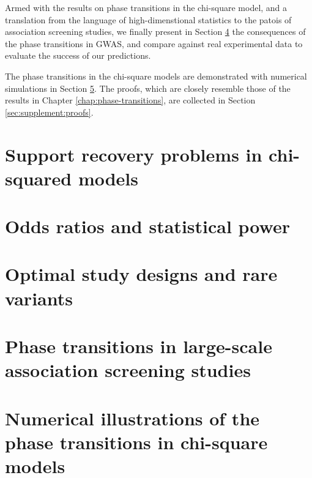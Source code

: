 Armed with the results on phase transitions in the chi-square model, and a translation from the language of high-dimenstional statistics to the patois of association screening studies, we finally present in Section \ref{sec:phase-transitions-in-GWAS} the consequences of the phase transitions in \ac{GWAS}, and compare against real experimental data to evaluate the success of our predictions.

The phase transitions in the chi-square models are demonstrated with numerical simulations in Section \ref{sec:numerical}.
The proofs, which are closely resemble those of the results in Chapter \ref{chap:phase-transitions}, are collected in Section \ref{sec:supplement:proofs}.


\section{Support recovery problems in chi-squared models}
\label{sec:chisq-boundaries}



\section{Odds ratios and statistical power}
\label{sec:odds-and-power}



\section{Optimal study designs and rare variants}
\label{sec:optimal-design} 



\section{Phase transitions in large-scale association screening studies}
\label{sec:phase-transitions-in-GWAS}



\section{Numerical illustrations of the phase transitions in chi-square models}
\label{sec:numerical}



%
